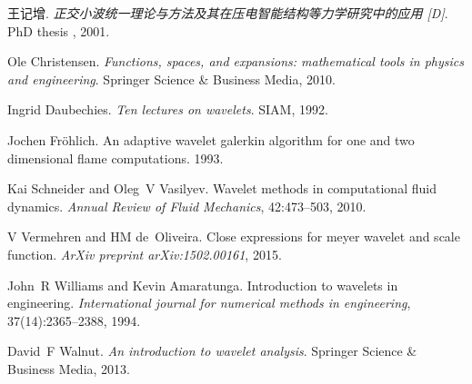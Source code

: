 \documentclass{book}
\newcommand{\tmtextit}[1]{{\itshape{#1}}}
\begin{document}
\begin{thebibliography}{1}
  王记增.{\newblock}
  \tmtextit{正交小波统一理论与方法及其在压电智能结构等力学研究中的应用
  [D]}.{\newblock} PhD thesis , 2001.{\newblock}
  
  Ole Christensen.{\newblock}
  \tmtextit{Functions, spaces, and expansions: mathematical tools in physics
  and engineering}.{\newblock} Springer Science \& Business Media,
  2010.{\newblock}
  
  Ingrid Daubechies.{\newblock} \tmtextit{Ten
  lectures on wavelets}.{\newblock} SIAM, 1992.{\newblock}
  
  Jochen Fr{\"o}hlich.{\newblock} An adaptive
  wavelet galerkin algorithm for one and two dimensional flame
  computations.{\newblock} 1993.{\newblock}
  
  Kai Schneider  and  Oleg~V
  Vasilyev.{\newblock} Wavelet methods in computational fluid
  dynamics.{\newblock} \tmtextit{Annual Review of Fluid Mechanics},
  42:473--503, 2010.{\newblock}
  
  V Vermehren  and  HM de~Oliveira.{\newblock}
  Close expressions for meyer wavelet and scale function.{\newblock}
  \tmtextit{ArXiv preprint arXiv:1502.00161}, 2015.{\newblock}
  
  John~R Williams  and  Kevin
  Amaratunga.{\newblock} Introduction to wavelets in engineering.{\newblock}
  \tmtextit{International journal for numerical methods in engineering},
  37(14):2365--2388, 1994.{\newblock}
  
  David~F Walnut.{\newblock} \tmtextit{An
  introduction to wavelet analysis}.{\newblock} Springer Science \& Business
  Media, 2013.{\newblock}
\end{thebibliography}
\end{document}
